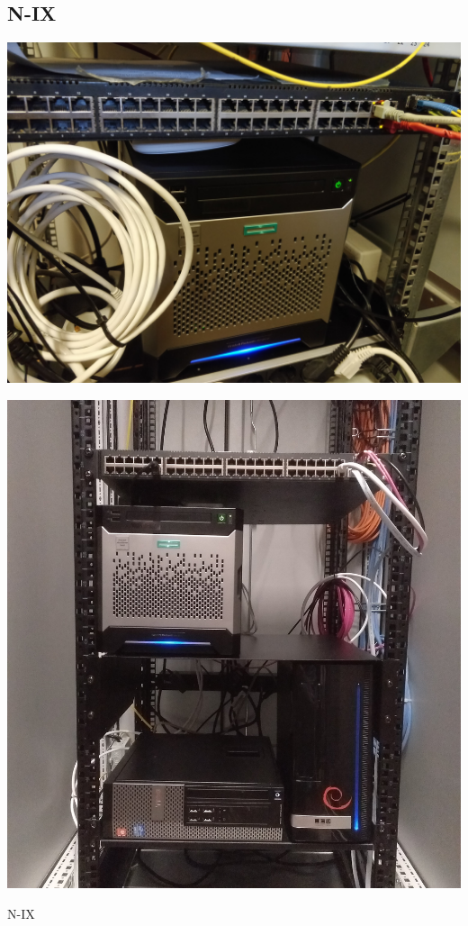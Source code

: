 \documentclass{beamer}
\begin{document}
	\subsection{N-IX}
	\begin{frame}
		\centering
		\includegraphics[width=\framewidth]{media/zbau-server.jpg}
	\end{frame}
	\begin{frame}
		\centering
		\includegraphics[height=\textheight]{media/zbau-server-neu.jpg}
	\end{frame}
	\begin{frame}{N-IX}
	\end{frame}
\end{document}
